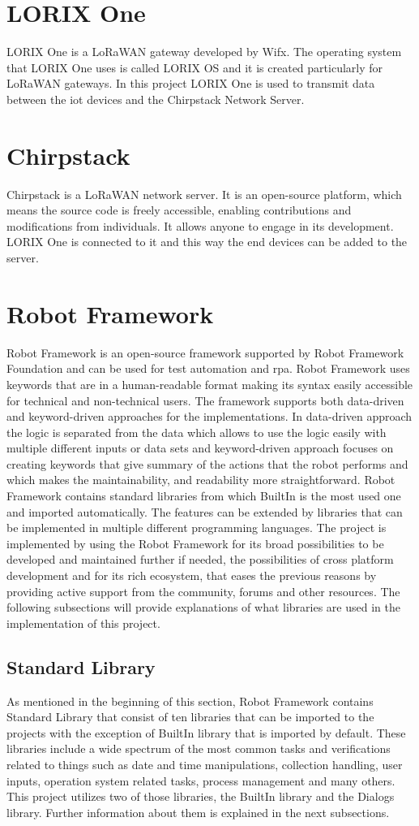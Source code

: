 \section{LORIX One}
LORIX One is a LoRaWAN gateway developed by Wifx.
The operating system that LORIX One uses is called LORIX OS and it is created particularly for LoRaWAN gateways.
In this project LORIX One is used to transmit data between the \gls{iot} devices and the Chirpstack Network Server.
\section{Chirpstack}
Chirpstack is a LoRaWAN network server. It is an open-source platform, which means the source code is freely accessible, enabling contributions and modifications from individuals. It allows anyone to engage in its development. LORIX One is connected to it and this way the end devices can be added to the server.
\section{Robot Framework}
Robot Framework is an open-source framework supported by Robot Framework Foundation and can be used for test automation and \gls{rpa}.
Robot Framework uses keywords that are in a human-readable format making its syntax easily accessible for technical and non-technical users.
The framework supports both data-driven and keyword-driven approaches for the implementations.
In data-driven approach the logic is separated from the data which allows to use the logic easily with multiple different inputs or data sets and keyword-driven approach focuses on creating keywords that give summary of the actions that the robot performs and which makes the maintainability, and readability more straightforward.
Robot Framework contains standard libraries from which BuiltIn is the most used one and imported automatically.
The features can be extended by libraries that can be implemented in multiple different programming languages.
The project is implemented by using the Robot Framework for its broad possibilities to be developed and maintained further if needed, the possibilities of cross platform development and for its rich ecosystem, that eases the previous reasons by providing active support from the community, forums and other resources.
The following subsections will provide explanations of what libraries are used in the implementation of this project.

\subsection{Standard Library}
As mentioned in the beginning of this section, Robot Framework contains Standard Library that consist of ten libraries that can be imported to the projects with the exception of BuiltIn library that is imported by default.
These libraries include a wide spectrum of the most common tasks and verifications related to things such as date and time manipulations, collection handling, user inputs, operation system related tasks, process management and many others.
This project utilizes two of those libraries, the BuiltIn library and the Dialogs library.
Further information about them is explained in the next subsections.
